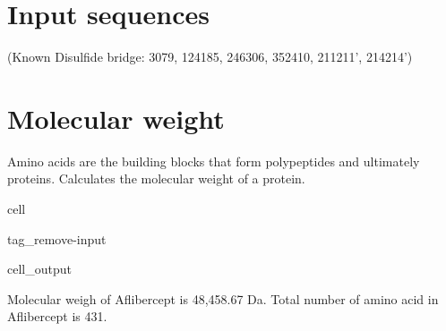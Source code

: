 \documentclass[letterpaper,10pt,english]{jupyterBook}
\begin{document}
\section{Input sequences}
\label{\detokenize{ipynb/chapter1:input-sequences}}
\begin{sphinxVerbatim}[commandchars=\\\{\}]
     
     
     
     
     
     
     
 
\end{sphinxVerbatim}

\sphinxAtStartPar
(Known Disulfide bridge: 30\sphinxhyphen{}79, 124\sphinxhyphen{}185, 246\sphinxhyphen{}306, 352\sphinxhyphen{}410, 211\sphinxhyphen{}211’, 214\sphinxhyphen{}214’)


\section{Molecular weight}
\label{\detokenize{ipynb/chapter1:molecular-weight}}
\sphinxAtStartPar
Amino acids are the building blocks that form polypeptides and ultimately proteins. Calculates the molecular weight of a protein.

\begin{sphinxuseclass}{cell}
\begin{sphinxuseclass}{tag_remove-input}\begin{sphinxVerbatimOutput}

\begin{sphinxuseclass}{cell_output}
\begin{sphinxVerbatim}[commandchars=\\\{\}]
Molecular weigh of Aflibercept is 48,458.67 Da.
Total number of amino acid in Aflibercept is 431.
\end{sphinxVerbatim}

\end{sphinxuseclass}\end{sphinxVerbatimOutput}

\end{sphinxuseclass}
\end{sphinxuseclass}
\end{document}
